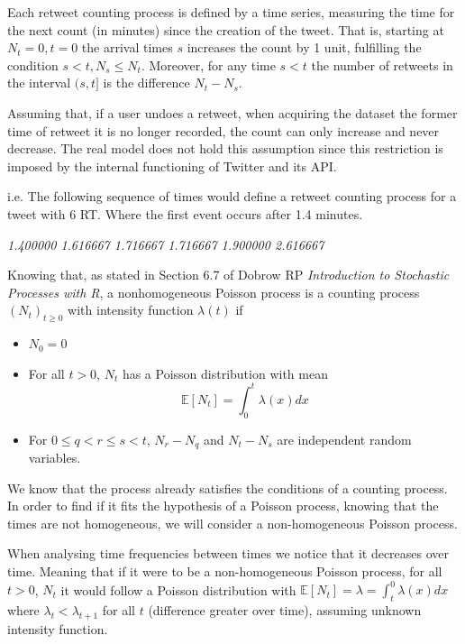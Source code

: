 Each retweet counting process is defined by a time series, measuring the time for the next count (in minutes) since the creation of the tweet. 
That is, starting at $N_t=0, t=0$ the arrival times $s$ increases the count by 1 unit, fulfilling the condition $s<t, N_s \leq N_t$. Moreover, for any time $s<t$ the number of retweets in the interval $(s, t]$ is the difference $N_t -N_s$. 

Assuming that, if a user undoes a retweet, when acquiring the dataset the former time of retweet it is no longer recorded, the count can only increase and never decrease. 
The real model does not hold this assumption since this restriction is imposed by the internal functioning of Twitter and its API. 

i.e. The following sequence of times would define a retweet counting process for a tweet with 6 RT. 
Where the first event occurs after 1.4 minutes.

\begin{center}
\textit{1.400000    1.616667    1.716667    1.716667    1.900000    2.616667}
\end{center}

Knowing that, as stated in Section 6.7 of Dobrow RP \textit{Introduction to Stochastic Processes with R}, a nonhomogeneous Poisson process is a counting process $(N_t)_{t\geq0}$ with intensity function $\lambda(t)$ if
\begin{itemize}
	\item $N_0 = 0$ 
	\item For all $t>0$, $N_t$ has a Poisson distribution with mean
	\[\mathbb{E}[N_t] = \int^t_0\lambda(x)dx\]
	\item For $0\leq q < r \leq s < t$, $N_r - N_q$ and $N_t - N_s$ are independent random variables.
\end{itemize}

We know that the process already satisfies the conditions of a counting process. In order to find if it fits the hypothesis of a Poisson process, knowing that the times are not homogeneous, we will consider a non-homogeneous Poisson process.

When analysing time frequencies between times we notice that it decreases over time. Meaning that if it were to be a non-homogeneous Poisson process, for all $t>0$, $N_t$ it would follow a Poisson distribution with $\mathbb{E}[N_t] = \lambda = \int_{t}^{0} \lambda(x)dx$ where $\lambda_t < \lambda_{t+1}$ for all $t$ (difference greater over time), assuming unknown intensity function.


